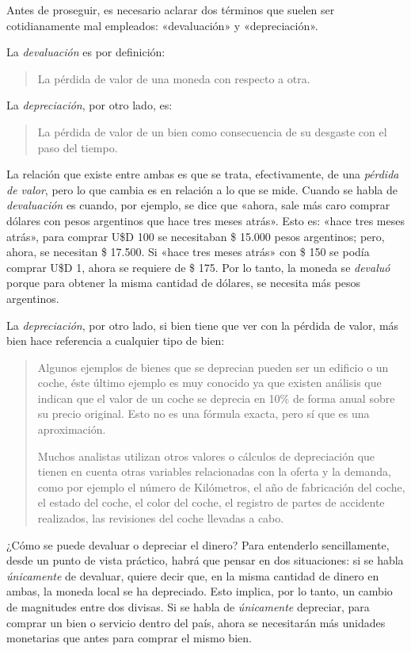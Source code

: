 \documentclass[12pt,a4paper,twoside]{book}
\begin{document}
Antes de proseguir, es necesario aclarar dos términos que suelen ser cotidianamente mal empleados: «devaluación» y «depreciación».

La \textit{devaluación} es por definición:

\begin{quote}
La pérdida de valor de una moneda con respecto a otra. \cite{epedia:deval}
\end{quote}

La \textit{depreciación}, por otro lado, es:

\begin{quote}
La pérdida de valor de un bien como consecuencia de su desgaste con el paso del tiempo. \cite{epedia:depr}
\end{quote}

La relación que existe entre ambas es que se trata, efectivamente, de una \textit{pérdida de valor}, pero lo que cambia es en relación a lo que se mide. Cuando se habla de \textit{devaluación} es cuando, por ejemplo, se dice que «ahora, sale más caro comprar dólares con pesos argentinos que hace tres meses atrás». Esto es: «hace tres meses atrás», para comprar U\$D 100 se necesitaban \$ 15.000 pesos argentinos; pero, ahora, se necesitan \$ 17.500. Si «hace tres meses atrás» con \$ 150 se podía comprar U\$D 1, ahora se requiere de \$ 175. Por lo tanto, la moneda se \textit{devaluó} porque para obtener la misma cantidad de dólares, se necesita más pesos argentinos.

La \textit{depreciación}, por otro lado, si bien tiene que ver con la pérdida de valor, más bien hace referencia a cualquier tipo de bien:

\begin{quotation}
Algunos ejemplos de bienes que se deprecian pueden ser un edificio o un coche, éste último ejemplo es muy conocido ya que existen análisis que indican que el valor de un coche se deprecia en 10\% de forma anual sobre su precio original. Esto no es una fórmula exacta, pero sí que es una aproximación.

Muchos analistas utilizan otros valores o cálculos de depreciación que tienen en cuenta otras variables relacionadas con la oferta y la demanda, como por ejemplo el número de Kilómetros, el año de fabricación del coche, el estado del coche, el color del coche, el registro de partes de accidente realizados, las revisiones del coche llevadas a cabo. \cite{epedia:depr}
\end{quotation}

¿Cómo se puede devaluar o depreciar el dinero? Para entenderlo sencillamente, desde un punto de vista práctico, habrá que pensar en dos situaciones: si se habla \textit{únicamente} de devaluar, quiere decir que, en la misma cantidad de dinero en ambas, la moneda local se ha depreciado. Esto implica, por lo tanto, un cambio de magnitudes entre dos divisas. Si se habla de \textit{únicamente} depreciar, para comprar un bien o servicio dentro del país, ahora se necesitarán más unidades monetarias que antes para comprar el mismo bien.
\end{document}
